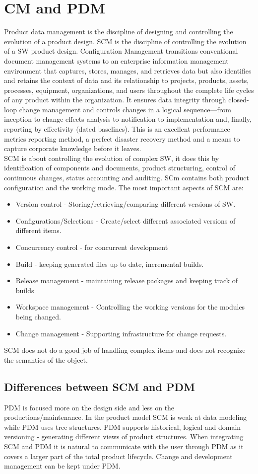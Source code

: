 \section{CM and PDM}
Product data management is the discipline of designing and controlling the evolution of a product design. SCM is the discipline of controlling the evolution of a SW product design.
Configuration Management transitions conventional document management systems to an
enterprise information management environment that captures, stores, manages, and retrieves
data but also identifies and retains the context of data and its relationship to projects, products,
assets, processes, equipment, organizations, and users throughout the complete life cycles of any
product within the organization. It ensures data integrity through closed-loop change management and
controls changes in a logical sequence—from inception to change-effects analysis to notification
to implementation and, finally, reporting by effectivity (dated baselines). This is an excellent
performance metrics reporting method, a perfect disaster recovery method and a means to
capture corporate knowledge before it leaves. \\
SCM is about controlling the evolution of complex SW, it does this by identification of components and documents, product structuring, control of continuous changes,
status accounting and auditing. SCm contains both product configuration and the working mode.
The most important aspects of SCM are:
\begin{itemize}
    \item Version control - Storing/retrieving/comparing different versions of SW.
    \item Configurations/Selections - Create/select different associated versions of different items.
    \item Concurrency control - for concurrent development
    \item Build - keeping generated files  up to date, incremental builds.
    \item Release management - maintaining release packages and keeping track of builds 
    \item Workspace management - Controlling the working versions for the modules being changed.
    \item Change management - Supporting infrastructure for change requests.
\end{itemize}
SCM does not do a good job of handling complex items and does not recognize the semantics of the object.
\subsection{Differences between SCM and PDM}
PDM is focused more on the design side and less on the productions/maintenance.
In the product model SCM  is weak at data modeling while PDM uses tree structures. PDM supports historical, logical and domain versioning - generating different views of product structures.
When integrating SCM and PDM it is natural to communicate with the user through PDM as it covers a larger part of the total product lifecycle. Change and development management can be kept under PDM.







